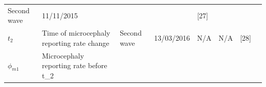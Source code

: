 \documentclass[10pt,letterpaper]{article}
\begin{document}
\begin{longtable}[]{@{}llllllll@{}}
\begin{minipage}[t]{0.05\columnwidth}
Second wave\strut
\end{minipage} & \begin{minipage}[t]{0.05\columnwidth}\raggedright\strut
11/11/2015\strut
\end{minipage} & \begin{minipage}[t]{0.04\columnwidth}\raggedright\strut
\strut
\end{minipage} & \begin{minipage}[t]{0.04\columnwidth}\raggedright\strut
\strut
\end{minipage} & \begin{minipage}[t]{0.14\columnwidth}\raggedright\strut
{[}27{]}\strut
\end{minipage} & \begin{minipage}[t]{0.26\columnwidth}\raggedright\strut
\strut
\end{minipage}\tabularnewline
\begin{minipage}[t]{0.04\columnwidth}\raggedright\strut
\(t_2\)\strut
\end{minipage} & \begin{minipage}[t]{0.17\columnwidth}\raggedright\strut
Time of microcephaly reporting rate change\strut
\end{minipage} & \begin{minipage}[t]{0.05\columnwidth}\raggedright\strut
Second wave\strut
\end{minipage} & \begin{minipage}[t]{0.05\columnwidth}\raggedright\strut
13/03/2016\strut
\end{minipage} & \begin{minipage}[t]{0.04\columnwidth}\raggedright\strut
N/A\strut
\end{minipage} & \begin{minipage}[t]{0.04\columnwidth}\raggedright\strut
N/A\strut
\end{minipage} & \begin{minipage}[t]{0.14\columnwidth}\raggedright\strut
{[}28{]}\strut
\end{minipage} & \begin{minipage}[t]{0.26\columnwidth}\raggedright\strut
\strut
\end{minipage}\tabularnewline
\begin{minipage}[t]{0.04\columnwidth}\raggedright\strut
\(\phi_{m1}\)\strut
\end{minipage} & \begin{minipage}[t]{0.17\columnwidth}\raggedright\strut
Microcephaly reporting rate before t\_2\strut
\end{minipage} & \begin{minipage}[t]{0.05\columnwidth}\raggedright\strut

\end{minipage}
\end{longtable}
\end{document}
